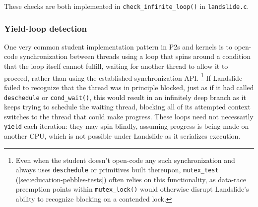 These checks are both implemented in {\tt check\_infinite\_loop()} in {\tt landslide.c}.

\subsubsection{Yield-loop detection}

One very common student implementation pattern in P2s and kernels is to open-code
synchronization between threads using a loop that spins around a condition that the loop itself cannot fulfill,
waiting for another thread to allow it to proceed,
rather than using the established synchronization API.%
\footnote{Even when the student doesn't open-code any such synchronization and always uses {\tt deschedule}
or primitives built thereupon,
{\tt mutex\_test} (\cref{sec:education-pebbles-tests})
often relies on this functionality, as data-race preemption points within {\tt mutex\_lock()}
would otherwise disrupt Landslide's ability to recognize blocking on a contended lock.}
If Landslide failed to recognize that the thread was in principle blocked,
just as if it had called {\tt deschedule} or {\tt cond\_wait()},
this would result in an infinitely deep branch
as it keeps trying to schedule the waiting thread,
blocking all of its attempted context switches to the thread that could make progress.
These loops need not necessarily {\tt yield} each iteration:
they may spin blindly,
assuming progress is being made on another CPU,
which is not possible under Landslide as it serializes execution.

